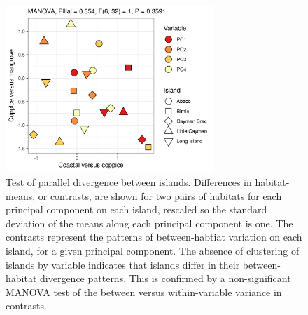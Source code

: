 \begin{figure}[H]
	\centering
	\includegraphics[width=0.7\textwidth]{"../analyses/09-parallelism/figure_contrasts"}
	\caption{Test of parallel divergence between islands. Differences in habitat-means, or contrasts, are shown for two pairs of habitats for each principal component on each island, rescaled so the standard deviation of the means along each principal component is one. The contrasts represent the patterns of between-habtiat variation on each island, for a given principal component. The absence of clustering of islands by variable indicates that islands differ in their between-habitat divergence patterns. This is confirmed by a non-significant MANOVA test of the between versus within-variable variance in contrasts.}
	\label{supfig:contrasts}
\end{figure}